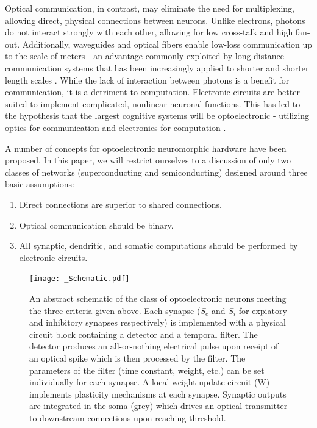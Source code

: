 \documentclass[twocolumn]{article}
\begin{document}
Optical communication, in contrast, may eliminate the need for multiplexing, allowing direct, physical connections between neurons. Unlike electrons, photons do not interact strongly with each other, allowing for low cross-talk and high fan-out. Additionally, waveguides and optical fibers enable low-loss communication up to the scale of meters - an advantage commonly exploited by long-distance communication systems that has been increasingly applied to shorter and shorter length scales \cite{miller2017attojoule}. While the lack of interaction between photons is a benefit for communication, it is a detriment to computation. Electronic circuits are better suited to implement complicated, nonlinear neuronal functions. This has led to the hypothesis that the largest cognitive systems will be optoelectronic - utilizing optics for communication and electronics for computation \cite{shainline2018largest}.

A number of concepts for optoelectronic neuromorphic hardware have been proposed. In this paper, we will restrict ourselves to a discussion of only two classes of networks (superconducting and semiconducting) designed around three basic assumptions:


\begin{enumerate}
    \item Direct connections are superior to shared connections.
    \item Optical communication should be binary.
    \item All synaptic, dendritic, and somatic computations should be performed by electronic circuits.
\end{enumerate}

\begin{figure}
    \centering
    \texttt{[image: \_Schematic.pdf]}
    \caption{An abstract schematic of the class of optoelectronic neurons meeting the three criteria given above. Each synapse ($S_e$ and $S_i$ for expiatory and inhibitory synapses respectively) is implemented with a physical circuit block containing a detector and a temporal filter. The detector produces an all-or-nothing electrical pulse upon receipt of an optical spike which is then processed by the filter. The parameters of the filter (time constant, weight, etc.) can be set individually for each synapse. A local weight update circuit (W) implements plasticity mechanisms at each synapse. Synaptic outputs are integrated in the soma (grey) which drives an optical transmitter to downstream connections upon reaching threshold.}
    \label{fig:Schematic}
\end{figure}
\end{document}
